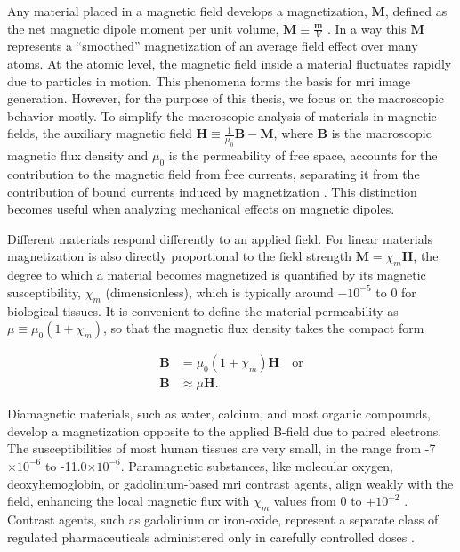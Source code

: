 Any material placed in a magnetic field develops a magnetization, $\mathbf{M}$, defined as the net magnetic dipole moment per unit volume, $\mathbf{M} \equiv \frac{\boldsymbol{m}}{V}$ \cite{griffiths2013electrodynamics}. In a way this  $\mathbf{M}$ represents a ``smoothed'' magnetization of an average field effect over many atoms. At the atomic level, the magnetic field inside a material fluctuates rapidly due to particles in motion. This phenomena forms the basis for \gls{mri} image generation. However, for the purpose of this thesis, we focus on the macroscopic behavior mostly. To simplify the macroscopic analysis of materials in magnetic fields, the auxiliary magnetic field $\mathbf{H} \equiv \frac{1}{\mu_0} \mathbf{B} - \mathbf{M}$, where $\mathbf{B}$ is the macroscopic magnetic flux density and $\mu_0$ is the permeability of free space, accounts for the contribution to the magnetic field from free currents, separating it from the contribution of bound currents induced by magnetization \cite{griffiths2013electrodynamics}. This distinction becomes useful when analyzing mechanical effects on magnetic dipoles.

Different materials respond differently to an applied field. For linear materials magnetization is also directly proportional to the field strength $\mathbf{M} = \chi_m \mathbf{H}$, the degree to which a material becomes magnetized is quantified by its magnetic susceptibility, $\chi_m$ (dimensionless), which is typically around $-10^{-5}$ to 0 for biological tissues. It is convenient to define the material permeability as $\mu \equiv \mu_0(1 + \chi_m)$, so that the magnetic flux density takes the compact form

\begin{subequations}
	\begin{align}
		\mathbf{B} &= \mu_0(1+\chi_m)\mathbf{H} \quad \text{or} \label{eq:B_linear} \\
		\mathbf{B} &\approx \mu\mathbf{H}. \label{eq:B_approx}
	\end{align}
\end{subequations}

Diamagnetic materials, such as water, calcium, and most organic compounds, develop a magnetization opposite to the applied B-field due to paired electrons. The susceptibilities of most human tissues are very small, in the range from -7$\times10^{-6}$ to -11.0$\times10^{-6}$. Paramagnetic substances, like molecular oxygen, deoxyhemoglobin, or gadolinium-based \gls{mri} contrast agents, align weakly with the field, enhancing the local magnetic flux with $\chi_m$ values from 0 to $+10^{-2}$ \cite{Schenck2000}. Contrast agents, such as gadolinium or iron‑oxide, represent a separate class of regulated pharmaceuticals administered only in carefully controlled doses \cite{Shah2023}. 

